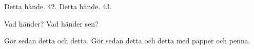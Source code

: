 

\BasicTasks %

\Task 
\Subtask Detta hände. 42.
\Subtask Detta hände. 43.


\Task  
\Subtask Vad händer?
\Subtask Vad händer sen?

\Task Gör sedan detta och detta. 
\TaskPen Gör sedan detta och detta med papper och penna.

\ExtraTasks %
\lipsum[2]


\AdvancedTasks %
\lipsum[2]